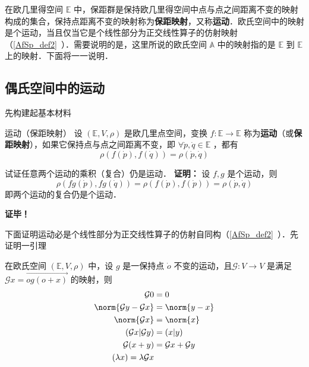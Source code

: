 
\begin{issues}
\end{issues}

在欧几里得空间 $\mathbb E$ 中，保距群是保持欧几里得空间中点与点之间距离不变的映射构成的集合，保持点距离不变的映射称为\textbf{保距映射}，又称\textbf{运动}．欧氏空间中的映射是个运动，当且仅当它是个线性部分为正交线性算子的仿射映射（\autoref{AfSp_def2}~）．需要说明的是，这里所说的欧氏空间 $\mathbb A$ 中的映射指的是 $\mathbb E$ 到 $\mathbb E$ 上的映射．下面将一一说明．
\subsection{偶氏空间中的运动}
先构建起基本材料
\begin{definition}{运动（保距映射）}
设 $(\mathbb E,V,\rho)$ 是欧几里点空间，变换 $f:\mathbb E\rightarrow\mathbb E$ 称为\textbf{运动}（或\textbf{保距映射}），如果它保持点与点之间距离不变，即 $\forall \dot p,\dot q\in\mathbb E$ ，都有
\begin{equation}
\rho(f(\dot p),f(\dot q))=\rho(\dot p,\dot q)
\end{equation}
\end{definition}
\begin{example}{}\label{CDQ2Ec_ex1}
试证任意两个运动的乘积（复合）仍是运动．
\textbf{证明：}
设 $f,g$ 是个运动，则
\begin{equation}
\rho(fg(\dot p),fg(\dot q))=\rho(f(\dot p),f(\dot p))=\rho(\dot p,\dot q)
\end{equation}
即两个运动的复合仍是个运动．

\textbf{证毕！}
\end{example}
下面证明运动必是个线性部分为正交线性算子的仿射自同构（\autoref{AfSp_def2}~）．先证明一引理
\begin{lemma}{}
在欧氏空间 $(\mathbb E,V,\rho)$ 中，设 $g$ 是一保持点 $\dot o$ 不变的运动，且$\mathcal G:V\rightarrow V$ 是满足 $\mathcal G x=\overrightarrow{og(o+x)}$ 的映射，则
\begin{equation}
\begin{aligned}
\mathcal G 0&=0\\
\norm{\mathcal Gy-\mathcal Gx}&=\norm{y-x}\\
\norm{\mathcal G x}&=\norm{x}\\
(\mathcal G x|\mathcal G y)&=(x|y)\\
\mathcal G(x+y)&=\mathcal G x+\mathcal G y\\
\mathcal(\lambda x)=\lambda\mathcal G x
\end{aligned}
\end{equation}
\end{lemma}
